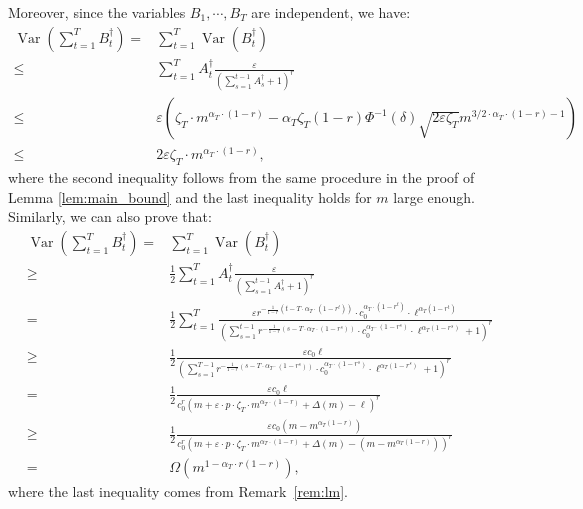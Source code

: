 \documentclass[nonblindrev]{informs3noheader}
\DeclareMathOperator{\Var}{Var}
\begin{document}
Moreover, since the variables $B_1,\cdots,B_T$ are independent, we have:
\begin{align*}
    \Var\left(\sum_{t=1}^T B^\dagger_t\right)
    =&\sum_{t=1}^T \Var(B^\dagger_t)\\
    \leq&\sum_{t=1}^T A^\dagger_t \frac{\varepsilon}{\left(\sum_{s=1}^{t-1} A^\dagger_s +1\right)^r}
    \\
    \leq & \varepsilon\left(\zeta_T \cdot m^{\alpha_T \cdot (1-r)} -  \alpha_T\zeta_T(1-r) \Phi^{-1}(\delta) \sqrt{2\varepsilon \zeta_T} m^{3/2 \cdot \alpha_T \cdot (1-r)-1}\right)\\
    \leq & 2\varepsilon\zeta_T \cdot m^{\alpha_T \cdot (1-r)},
\end{align*}
where the second inequality follows from the same procedure in the proof of Lemma \ref{lem:main_bound} and the last inequality holds for $m$ large enough. Similarly, we can also prove that:
\begin{align*}
    \Var\left(\sum_{t=1}^T B^\dagger_t\right)
    = &\sum_{t=1}^T \Var(B^\dagger_t)\\
    \geq&\frac{1}{2}\sum_{t=1}^T A^\dagger_t \frac{\varepsilon}{\left(\sum_{s=1}^{t-1} A^\dagger_s +1\right)^r}
    \\
    = &\frac{1}{2}\sum_{t=1}^T   \frac{\varepsilon r^{-\frac{1}{1-r}\left(t-T\cdot\alpha_T\cdot(1-r^t)\right)}\cdot c_0^{\alpha_T\cdot(1-r^t)}\cdot \ell^{\alpha_T(1-r^t)}}{\left(\sum_{s=1}^{t-1} r^{-\frac{1}{1-r}\left(s-T\cdot\alpha_T\cdot(1-r^s)\right)}\cdot c_0^{\alpha_T\cdot(1-r^s)}\cdot \ell^{\alpha_T(1-r^s)}  +1\right)^r}\\
    \geq & \frac{1}{2}   \frac{\varepsilon c_0 \ell}{\left(\sum_{s=1}^{T-1} r^{-\frac{1}{1-r}\left(s-T\cdot\alpha_T\cdot(1-r^s)\right)}\cdot c_0^{\alpha_T\cdot(1-r^s)}\cdot \ell^{\alpha_T(1-r^s)}  +1\right)^r}\\
    =& \frac{1}{2}   \frac{\varepsilon c_0 \ell}{c_0^r\left(m+\varepsilon\cdot p \cdot \zeta_T \cdot m^{\alpha_T \cdot(1-r)}+\Delta(m)-\ell\right)^r}\\
    \geq& \frac{1}{2}   \frac{\varepsilon c_0 \left(m-m^{\alpha_T(1-r)}\right)}{c_0^r\left(m+\varepsilon\cdot p \cdot \zeta_T \cdot m^{\alpha_T \cdot(1-r)}+\Delta(m)-\left(m-m^{\alpha_T(1-r)}\right)\right)^r}\\
    =& \Omega(m^{1-\alpha_T \cdot r(1-r)}),
\end{align*}
where the last inequality comes from Remark~\ref{rem:lm}.
\end{document}

